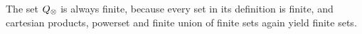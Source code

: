 %
%
%
%
%
%
%
%
%
%
%
%
%
%
%
%



\begin{remark}
The set $Q_{\otimes}$ is always finite, because every set in its definition is finite, and cartesian products, powerset and finite union of finite sets again yield finite sets.
\end{remark}

